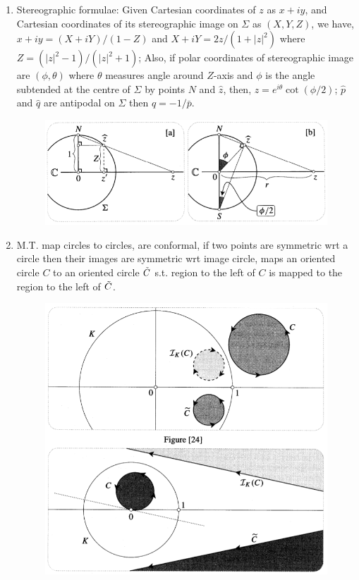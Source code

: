 \documentclass[12pt]{article}
\def\td{\ensuremath\tilde}
\def\td{\ensuremath\tilde}
\begin{document}
\begin{enumerate}
    \item Stereographic formulae: Given Cartesian coordinates of $z$ as $x+iy$, and Cartesian coordinates of its stereographic image on $\Sigma$ as $(X,Y,Z)$, we have, $x+iy = (X+iY)/(1-Z)$ and $X+iY = 2z/(1+|z|^2)$ where $Z = (|z|^2-1)/(|z|^2+1)$; Also, if polar coordinates of stereographic image are $(\phi,\theta)$ where $\theta$ measures angle around $Z$-axis and $\phi$ is the angle subtended at the centre of $\Sigma$ by points $N$ and $\hat{z}$, then, $z = e^{i\theta}\cot(\phi/2)$; $\hat{p}$ and $\hat{q}$ are antipodal on $\Sigma$ then $q = -1/\bar{p}$.

    \begin{figure}[h!]
        \centering
        \includegraphics[scale=0.7]{fig_16}
        \label{f16}
    \end{figure}

    \item M.T. map circles to circles, are conformal, if two points are symmetric wrt a circle then their images are symmetric wrt image circle, maps an oriented circle $C$ to an oriented circle $\td{C}$ s.t. region to the left of $C$ is mapped to the region to the left of $\td{C}$.

    \begin{figure}[h!]
        \centering
        \includegraphics[scale=0.7]{fig_17}
        \label{f17}
    \end{figure}


\end{enumerate}
\end{document}
